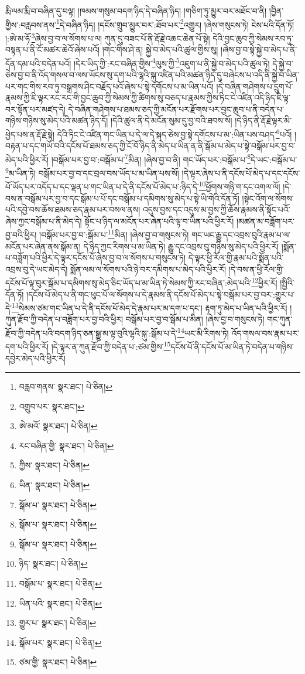 རྨི་ལམ་རྨི་བ་བཞིན་དུ་བལྟ། །ཁམས་གསུམ་བདག་ཉིད་དེ་བཞིན་ཉིད། །གཅིག་ཏུ་མྱུར་བར་མཐོང་བ་ནི། །བྱིན་གྱིས་:བརླབས་ནས་\footnote{བརླབ་གནས་  སྣར་ཐང་།  པེ་ཅིན། }དེ་བཞིན་ཉིད། །དངོས་གྲུབ་མྱུར་བར་:ཐོབ་པར་\footnote{འགྲུབ་པར་  སྣར་ཐང་། }འགྱུར། །ཞེས་གསུངས་ཏེ། ངེས་པའི་དོན་ཏོ། །:ཨེ་མ་ཧོ་\footnote{ཨེ་མའོ་  སྣར་ཐང་།  པེ་ཅིན། }ཞེས་བྱ་བ་ལ་སོགས་པ་ལ། ཀུན་དུ་བཟང་པོ་ནི་རྡོ་རྗེ་འཆང་ཆེན་པོ་སྟེ། དེའི་བྱང་ཆུབ་ཀྱི་སེམས་རབ་ཏུ་བསྟན་པ་ནི་ངོ་མཚར་ཆེའོ་ཞེས་པའོ། །གང་གིས་ཤེ་ན། སྐྱེ་བ་མེད་པའི་ཚུལ་གྱིས་སུ། །ཞེས་བྱ་བ་སྟེ་སྐྱེ་བ་མེད་པ་ནི་དོན་དམ་པའི་བདེན་པའོ། །དེར་ཡིད་ཀྱི་:རང་བཞིན་གྱིས་\footnote{རང་བཞིན་གྱི་  སྣར་ཐང་།  པེ་ཅིན། }ལུས་ཀྱི་\footnote{ཀྱིས་  སྣར་ཐང་།  པེ་ཅིན། }འཇུག་པ་ནི་སྐྱེ་བ་མེད་པའི་ཚུལ་ཏེ། དེ་སྐྱེ་བ་ཅེས་བྱ་བ་ནི་འོད་གསལ་བ་ལས་ཡོངས་སུ་དག་པའི་ལྷའི་སྐུ་འཛིན་པའི་མཚན་ཉིད་དུ་བཞེངས་པ་འདི་ནི་སྐྱེ་བ་ཡིན་པར་གང་གིས་རབ་ཏུ་བསྒྲགས་ཤིང་བརྗོད་པའོ་ཞེས་པ་སྟེ་དགོངས་པ་མ་ཡིན་པའོ། །དེ་བཞིན་གཤེགས་པ་དྲུག་པོ་རྣམས་ཀྱི་ཇི་ལྟར་རང་རང་གི་བྱང་ཆུབ་ཀྱི་སེམས་ཀྱི་ཚིགས་སུ་བཅད་པ་རྣམས་ཀྱིས་ཏིང་ངེ་འཛིན་འདི་ཉིད་ཇི་ལྟ་བར་སྟོན་པར་མཛད་དེ། དེ་བཞིན་གཤེགས་པ་ཐམས་ཅད་ཀྱི་མངོན་པར་རྫོགས་པར་བྱང་ཆུབ་པ་ནི་བདེན་པ་གཉིས་གཉིས་སུ་མེད་པའི་མཚན་ཉིད་དོ། །དེའི་ཚུལ་ནི་དེ་མངོན་སུམ་དུ་བྱ་བའི་ཐབས་སོ། །དེ་ཉིད་ནི་རྡོ་རྗེ་ལྟར་མི་ཕྱེད་པས་ན་རྡོ་རྗེ་སྟེ། དེའི་ཏིང་ངེ་འཛིན་གང་ཡིན་པ་དེ་ལ་དེ་སྐད་ཅེས་བྱ་སྟེ་དགོངས་པ་མ་:ཡིན་པས་བཤད་\footnote{ཡིན་  སྣར་ཐང་།  པེ་ཅིན། }པའོ། །བརྟན་པ་དང་གཡོ་བའི་དངོས་པོ་ཐམས་ཅད་ཀྱི་ངོ་བོ་ཉིད་ནི་མེད་པ་ཡིན་ན་ནི་སྒོམ་པ་མེད་པ་སྟེ་བསྒོམ་པར་བྱ་བ་མེད་པའི་ཕྱིར་རོ། །བསྒོམ་པར་བྱ་བ་:བསྒོམ་པ་\footnote{སྒོམ་པ་  སྣར་ཐང་།  པེ་ཅིན། }མིན། །ཞེས་བྱ་བ་ནི། གང་ཡོད་པར་:བསྒོམ་པ་\footnote{སྒོམ་པ་  སྣར་ཐང་།  པེ་ཅིན། }དེ་ཡང་:བསྒོམ་པ་\footnote{སྒོམ་པ་  སྣར་ཐང་།  པེ་ཅིན། }མ་ཡིན་ཏེ། བསྒོམ་པར་བྱ་བ་དང་བྲལ་བས་ཡོད་པ་མ་ཡིན་པས་སོ། །དེ་ལྟར་ཞེས་པ་ནི་དངོས་པོ་མེད་པ་དང་དངོས་པོ་ཡོད་པར་འདོད་པ་དང་ལྡན་པ་གང་ཡིན་པ་དེ་ནི་དངོས་པོ་མེད་པ་:ཉིད་དེ་\footnote{ཉིད་  སྣར་ཐང་།  པེ་ཅིན། }ཕྱོགས་གཉི་ག་དང་འགལ་ལོ། །དེ་བས་ན་བསྒོམ་པར་བྱ་བ་དང་སྒོམ་པ་པོ་དང་བསྒོམ་པ་དམིགས་སུ་མེད་པ་སྟེ་ཡི་གེའི་དོན་ཏོ། །སྟེང་འོག་ལ་སོགས་པའི་དབྱེ་བས་ཆོས་ཐམས་ཅད་རྣམ་པར་བསལ་ནས། འདུས་བྱས་དང་འདུས་མ་བྱས་ཀྱི་ཆོས་རྣམས་ནི་སྟོང་པའོ་ཞེས་ཀྱང་བསྒོམ་པ་ནི་མེད་དེ། སྟོང་པ་ཉིད་ལ་མངོན་པར་ཞེན་པའི་ལྟ་བ་ཡིན་པའི་ཕྱིར་རོ། །མཚན་མ་བཟློག་པར་བྱ་བའི་ཕྱིར། །བསྒོམ་པར་བྱ་བ་:སྒོམ་པ་\footnote{བསྒོམ་པ་  སྣར་ཐང་།  པེ་ཅིན། }མིན། །ཞེས་བྱ་བ་གསུངས་ཏེ། གང་ཡང་རྒྱུ་དང་འབྲས་བུའི་རྣམ་པ་ལ་མངོན་པར་ཞེན་ནས་སྒོམ་ན། དེ་ཉིད་ཀྱང་རིགས་པ་མ་ཡིན་ཏེ། རྒྱུ་དང་འབྲས་བུ་གཉིས་སུ་མེད་པའི་ཕྱིར་རོ། །སྨོན་པ་བཟློག་པའི་ཕྱིར་དེ་ལྟར་དངོས་པོ་ཞེས་བྱ་བ་ལ་སོགས་པ་གསུངས་ཏེ། དེ་ལྟར་ཕྱི་རོལ་གྱི་རྣམ་པའི་སྨོན་པའི་འབྲས་བུ་དེ་ཡང་མེད་དེ། སྨོན་ལམ་ལ་སོགས་པའི་ཉེ་བར་དམིགས་པ་མེད་པའི་ཕྱིར་རོ། །དེ་བས་ན་ཕྱི་རོལ་གྱི་དངོས་པོ་ལྟ་བུར་སྒོམ་པ་དམིགས་སུ་མེད་ཅིང་ཡོད་པ་མ་ཡིན་ཏེ་སེམས་ཀྱི་རང་བཞིན་:མེད་པའི་\footnote{ཡིན་པའི་  སྣར་ཐང་།  པེ་ཅིན། }ཕྱིར་རོ། །སྤྱིའི་དོན་ཏོ། །དངོས་པོ་མེད་པ་ནི་གང་ཕུང་པོ་ལ་སོགས་པ་དེ་རྣམས་ནི་དངོས་པོ་མེད་པ་སྟེ་བསྒོམ་པར་བྱ་བར་:གྱུར་པ་དེ་\footnote{གྱུར་པ་  སྣར་ཐང་།  པེ་ཅིན། }སེམས་ཙམ་གང་ཡིན་པ་དེ་ནི་དངོས་པོ་མེད་དེ་རྣམ་པར་མ་དག་པ་དང་། རྟག་ཏུ་མེད་པ་ཡིན་པའི་ཕྱིར་རོ། །ཀུན་རྫོབ་ཀྱི་བདེན་པ་བཟློག་པར་བྱ་བའི་ཕྱིར། བསྒོམ་པར་བྱ་བ་སྒོམ་པ་མིན། །ཞེས་བྱ་བ་གསུངས་ཏེ། གང་ཀུན་རྫོབ་ཀྱི་བདེན་པའི་བདག་ཉིད་ཅན་སྒྱུ་མ་ལྟ་བུའི་ལྷའི་སྐུ་:སྒོམ་པ་དེ་\footnote{སྒོམ་པར་  སྣར་ཐང་།  པེ་ཅིན། }ཡང་མི་རིགས་ཏེ། འོད་གསལ་བས་རྣམ་པར་དག་པའི་ཕྱིར་རོ། །དེ་ལྟར་ན་ཀུན་རྫོབ་ཀྱི་བདེན་པ་:ཙམ་གྱིས་\footnote{ཙམ་གྱི་  སྣར་ཐང་།  པེ་ཅིན། }དངོས་པོ་ནི་དངོས་པོ་མ་ཡིན་ཏེ་བདེན་པ་གཉིས་དབྱེར་མེད་པའི་ཕྱིར་རོ། 